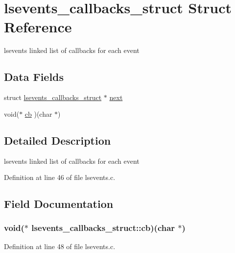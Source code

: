 \hypertarget{structlsevents__callbacks__struct}{\section{lsevents\-\_\-callbacks\-\_\-struct Struct Reference}
\label{structlsevents__callbacks__struct}
}


lsevents linked list of callbacks for each event  


\subsection*{Data Fields}
\begin{DoxyCompactItemize}
\item 
struct \hyperlink{structlsevents__callbacks__struct}{lsevents\-\_\-callbacks\-\_\-struct} $\ast$ \hyperlink{structlsevents__callbacks__struct_a6d673746e36b16df34d53e143c1ba881}{next}
\item 
void($\ast$ \hyperlink{structlsevents__callbacks__struct_a523024faf274afe9056748ddbe6def5c}{cb} )(char $\ast$)
\end{DoxyCompactItemize}


\subsection{Detailed Description}
lsevents linked list of callbacks for each event 

Definition at line 46 of file lsevents.\-c.



\subsection{Field Documentation}
\hypertarget{structlsevents__callbacks__struct_a523024faf274afe9056748ddbe6def5c}{
\subsubsection[{cb}]{\setlength{\rightskip}{0pt plus 5cm}void($\ast$ lsevents\-\_\-callbacks\-\_\-struct\-::cb)(char $\ast$)}}\label{structlsevents__callbacks__struct_a523024faf274afe9056748ddbe6def5c}


Definition at line 48 of file lsevents.\-c.

